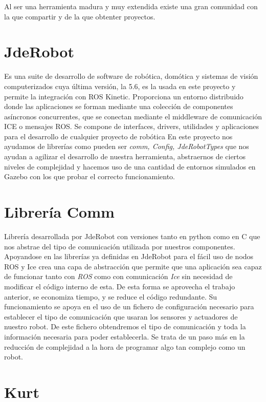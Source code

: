 Al ser una herramienta madura y muy extendida existe una gran comunidad con la que compartir y de la que obtenter proyectos.

\section{JdeRobot}
\label{sec:jderobot}
Es una suite de desarrollo de software de robótica, domótica y sistemas de
visión computerizados cuya última versión, la 5.6, es la usada en este proyecto y permite la integración con ROS Kinetic. Proporciona un entorno distribuido donde las aplicaciones se forman mediante una colección de componentes asíncronos concurrentes, que se conectan mediante el middleware de comunicación ICE o mensajes ROS.
Se compone de interfaces, drivers, utilidades y aplicaciones para el desarrollo de cualquier proyecto de robótica
En este proyecto nos ayudamos de librerías como pueden ser \textit{comm, Config, JdeRobotTypes} que nos ayudan a agilizar el desarrollo de nuestra herramienta, abstraernos de ciertos niveles de complejidad y hacemos uso de una cantidad de entornos simulados en Gazebo con los que probar el correcto funcionamiento.


\section{Librería Comm}
\label{sec:libreria-com}

Librería desarrollada por JdeRobot con versiones tanto en python como en C que nos abstrae del tipo de comunicación utilizada por nuestros componentes.
Apoyandose en las librerías ya definidas en JdeRobot para el fácil uso de nodos ROS y Ice crea una capa de abstracción que permite que una aplicación sea capaz de funcionar tanto con \textit{ROS} como con comunicación \textit{Ice} sin necesidad de modificar el código interno de esta. De esta forma se aprovecha el trabajo anterior, se economiza tiempo, y se reduce el código redundante.
Su funcionamiento se apoya en el uso de un fichero de configuración necesario para establecer el tipo de comunicación que usaran los sensores y actuadores de nuestro robot. De este fichero obtendremos el tipo de comunicación y toda la información necesaria para poder establecerla. 
Se trata de un paso más en la reducción de complejidad a la hora de programar algo tan complejo como un robot.


\section{Kurt}
\label{sec:kurt}

